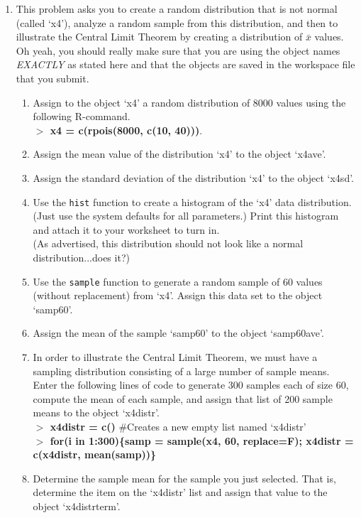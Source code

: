 \documentclass{article}
\newcommand{\Rin}[1]{\textbf{$>$ {#1}}}
\newcommand{\Rcom}[1]{\hspace{1cm} \#{#1}}
\begin{document}
\begin{enumerate}
\item This problem asks you to create a random distribution that is not normal (called `x4'), analyze a random sample from this distribution, and then to illustrate the Central Limit Theorem by creating a distribution of $\bar{x}$ values. Oh yeah, you should really make sure that you are using the object names {\em EXACTLY} as stated here and that the objects are saved in the workspace file that you submit.
	\begin{enumerate}
	\item Assign to the object `x4' a random distribution of 8000 values using the following R-command. \\
	\Rin{x4 = c(rpois(8000, c(10, 40)))}.
	\item Assign the mean value of the distribution `x4' to the object `x4ave'.
	\item Assign the standard deviation of the distribution `x4' to the object `x4sd'.
	\item Use the \texttt{hist} function to create a histogram of the `x4' data distribution. (Just use the system defaults for all parameters.) Print this histogram and attach it to your worksheet to turn in. \\
	(As advertised, this distribution should not look like a normal distribution...does it?)
	\item Use the \texttt{sample} function to generate a random sample of 60 values (without replacement) from `x4'. Assign this data set to the object `samp60'.
	\item Assign the mean of the sample `samp60' to the object `samp60ave'.
	\item In order to illustrate the Central Limit Theorem, we must have a sampling distribution consisting of a large number of sample means. Enter the following lines of code to generate 300 samples each of size 60, compute the mean of each sample, and assign that list of 200 sample means to the object `x4distr'. \\
	\Rin{x4distr = c()} \Rcom{Creates a new empty list named `x4distr'} \\
	\Rin{for(i in 1:300)\{samp = sample(x4, 60, replace=F); x4distr = c(x4distr, mean(samp))\}}
	\item Determine the sample mean for the  sample you just selected. That is, determine the  item on the `x4distr' list and assign that value to the object `x4distrterm'.

\end{enumerate}
\end{enumerate}
\end{document}
